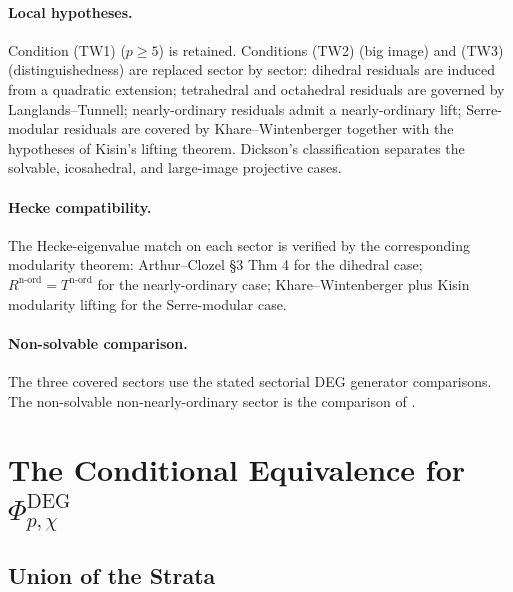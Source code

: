\paragraph{Local hypotheses.} Condition (TW1) (\(p\geq 5\)) is
retained. Conditions (TW2) (big image) and (TW3) (distinguishedness)
are replaced sector by sector: dihedral residuals are induced from a
quadratic extension; tetrahedral and octahedral residuals are governed
by Langlands--Tunnell; nearly-ordinary
residuals admit a nearly-ordinary lift; Serre-modular residuals are
covered by Khare--Wintenberger together with the hypotheses of Kisin's
lifting theorem. Dickson's classification separates the solvable,
icosahedral, and large-image projective cases.

\paragraph{Hecke compatibility.} The Hecke-eigenvalue match on each
sector is verified by the corresponding modularity theorem:
Arthur--Clozel \S 3 Thm 4 for the dihedral case;
\(R^{\mathrm{n\text{-}ord}}=T^{\mathrm{n\text{-}ord}}\) for the
nearly-ordinary case; Khare--Wintenberger plus Kisin modularity
lifting for the Serre-modular case.

\paragraph{Non-solvable comparison.} The three covered sectors use the
stated sectorial DEG generator comparisons. The non-solvable
non-nearly-ordinary sector is the comparison of
.

\section{The Conditional Equivalence for \(\Phi^{\mathrm{DEG}}_{p,\chi}\)}
\label{v4-arith:w6-e:assembly}

\subsection{Union of the Strata}


